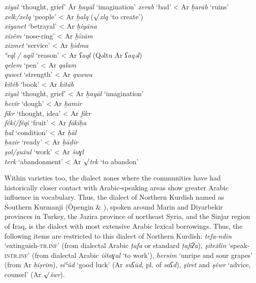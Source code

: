 \documentclass[output=paper]{langsci/langscibook}
\begin{document}
\ea
\begin{tabbing}
\textit{xiyal} ‘thought, grief’ \hspace{1em} \= Ar \textit{ḫayāl} ‘imagination’\kill
\textit{xerab} ‘bad’     \> < Ar \textit{ḫarāb} ‘ruins’\\
\textit{xelk/xelq} ‘people’  \> < Ar \textit{ḫalq} (${\surd}$\textit{xlq} ‘to create’)\\
\textit{xiyanet} ‘betrayal’  \> < Ar \textit{ḫiyāna} \\
\textit{xizêm} ‘nose-ring’  \> < Ar \textit{ḫizām}\\
\textit{xizmet} ‘service’  \> < Ar \textit{ḫidma} \\
\textit{ʿeql} \textit{/} \textit{aqil} ‘reason’  \> < Ar \textit{ʕaql} (Qəltu Ar \textit{ʕaqəl})\\
\textit{qelem} ‘pen’    \> < Ar \textit{qalam}\\
\textit{quwet} ‘strength’  \> < Ar \textit{quwwa}\\
\textit{kitêb} ‘book’    \> < Ar \textit{kitāb}\\
\textit{xiyal} ‘thought, grief’  \> < Ar \textit{ḫayāl} ‘imagination’\\
\textit{hevîr} ‘dough’    \> < Ar \textit{ḫamīr} \\
\textit{fikr} ‘thought, idea’  \> < Ar \textit{fikr}\\
\textit{fêkî/fêqî} ‘fruit’  \> < Ar \textit{fākiḥa}\\
\textit{ḥal} ‘condition’  \> < Ar \textit{ḥāl} \\
\textit{ḥazir} ‘ready’    \> < Ar \textit{ḥāḍir}\\
\textit{şol/şuẋul} ‘work’  \> < Ar \textit{šuɣl} \\
\textit{terk} ‘abandonment’  \> < Ar ${\surd}$\textit{trk} ‘to abandon’
\end{tabbing}
\z

Within varieties too, the dialect zones where the communities have had historically closer contact with Arabic-speaking areas show greater Arabic influence in vocabulary. Thus, the dialect of Northern Kurdish named as Southern Kurmanji (Öpengin \& \citealt{Haig2014}), spoken around Marin and Diyarbekir provinces in Turkey, the Jazira province of northeast Syria, and the Sinjar region of Iraq, is the dialect with most extensive Arabic lexical borrowings. Thus, the following items are restricted to this dialect of Northern Kurdish: \textit{tefa-ndin} ‘extinguish-\textsc{tr.inf}’ (from dialectal Arabic \textit{ṭafa} or standard \textit{ṭafiʔa}), \textit{şiteẋlîn} ‘speak-\textsc{intr.inf}’ (from dialectal Arabic \textit{ištaɣal} ‘to work’), \textit{hersim} ‘unripe and sour grapes’ (from Ar \textit{ḥiṣrim}), \textit{siʿûd} ‘good luck’ (Ar \textit{suʕūd}, pl. of \textit{saʕd}), \textit{şîret} and \textit{şêwr} ‘advice, counsel’ (Ar ${\surd}$\textit{šwr}).     
\end{document}
